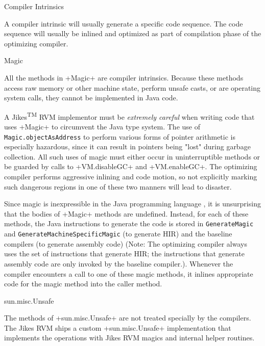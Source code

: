 \begin{section}{Compiler Intrinsics}
\label{sec:compilerintrinsics}

A compiler intrinsic will usually generate a specific code sequence. The code sequence will usually be inlined and optimized as part of compilation phase of the optimizing compiler.

\begin{subsubsection}{Magic}

All the methods in \spverb+Magic+ are compiler intrinsics. Because these methods access raw memory or other machine state, perform unsafe casts, or are operating system calls, they cannot be implemented in Java code.

A Jikes\textsuperscript{TM} RVM implementor must be \textit{extremely careful} when writing code that uses \spverb+Magic+ to circumvent the Java type system. The use of \texttt{Ma\-gic.ob\-ject\-As\-Address} to perform various forms of pointer arithmetic is especially hazardous, since it can result in pointers being "lost" during garbage collection. All such uses of magic must either occur in uninterruptible methods or be guarded by calls to \spverb+VM.disableGC+ and \spverb+VM.enableGC+. The optimizing compiler performs aggressive inlining and code motion, so not explicitly marking such dangerous regions in one of these two manners will lead to disaster.

Since magic is inexpressible in the Java programming language , it is unsurprising that the bodies of \spverb+Magic+ methods are undefined. Instead, for each of these methods, the Java instructions to generate the code is stored in \texttt{Ge\-ne\-ra\-te\-Ma\-gic} and \texttt{Ge\-ne\-ra\-te\-Ma\-chi\-ne\-Spe\-ci\-fic\-Ma\-gic} (to generate HIR) and the baseline compilers (to generate assembly code) (Note: The optimizing compiler always uses the set of instructions that generate HIR; the instructions that generate assembly code are only invoked by the baseline compiler.). Whenever the compiler encounters a call to one of these magic methods, it inlines appropriate code for the magic method into the caller method.

\end{subsubsection}

\begin{subsubsection}{sun.misc.Unsafe}

The methods of \spverb+sun.misc.Unsafe+ are not treated specially by the compilers. The Jikes RVM ships a custom \spverb+sun.misc.Unsafe+ implementation that implements the operations with Jikes RVM magics and internal helper routines.

\end{subsubsection}

\end{section}
